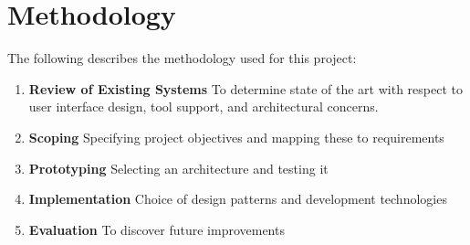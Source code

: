 \section{Methodology}

	The following describes the methodology used for this project:

	\begin{enumerate}[itemsep=1pt,parsep=1pt]
	
		\item 	\textbf{Review of Existing Systems} \newline
				To determine state of the art with respect to user interface design, tool support, and architectural concerns.
		\item 	\textbf{Scoping} \newline
				Specifying project objectives and mapping these to requirements
		\item 	\textbf{Prototyping} \newline
				Selecting an architecture and testing it
		\item  	\textbf{Implementation} \newline
				Choice of design patterns and development technologies
		\item   \textbf{Evaluation}
				To discover future improvements
		
	\end{enumerate}
			